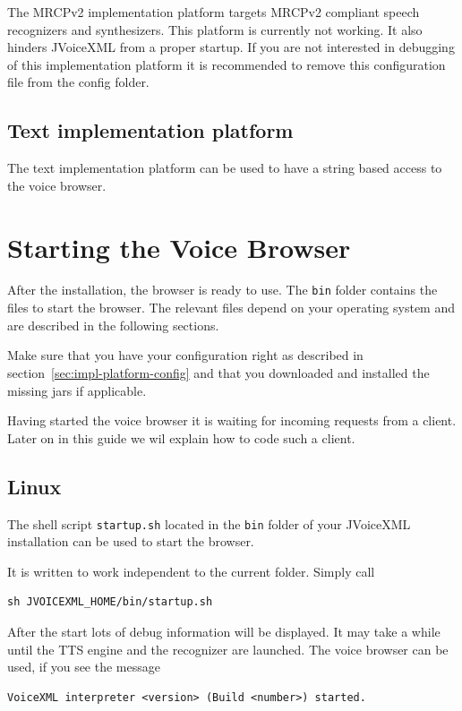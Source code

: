 \documentclass[11pt,a4paper]{article}
\begin{document}
The MRCPv2 implementation platform targets MRCPv2 compliant speech
recognizers and synthesizers. This platform is currently not working. It also
hinders JVoiceXML from a proper startup. If you are not interested in debugging
of this implementation platform it is recommended to remove this configuration
file from the config folder.

\subsection{Text implementation platform}

The text implementation platform can be used to have a string based access to
the voice browser.

\section{Starting the Voice Browser}

After the installation, the browser is ready to use. 
The \texttt{bin} folder contains the files to start the browser. The relevant
files depend on your operating system and are described in the following
sections.

Make sure that you have your configuration right as described in
section~\ref{sec:impl-platform-config} and that you downloaded and installed
the missing jars if applicable.

Having started the voice browser it is waiting for incoming requests from a
client. Later on in this guide we wil explain how to code such a client.

\subsection{Linux}

The shell script \texttt{startup.sh} located in the \texttt{bin} folder
of your JVoiceXML installation can be used to start the browser.

It is written to work independent to the current folder. Simply call

\begin{lstlisting}
sh JVOICEXML_HOME/bin/startup.sh
\end{lstlisting}

After the start lots of debug information will be displayed.
It may take a while until the TTS engine and the recognizer are launched.
The voice browser can be used, if you see the message

\begin{lstlisting}
VoiceXML interpreter <version> (Build <number>) started.
\end{lstlisting}
\end{document}
